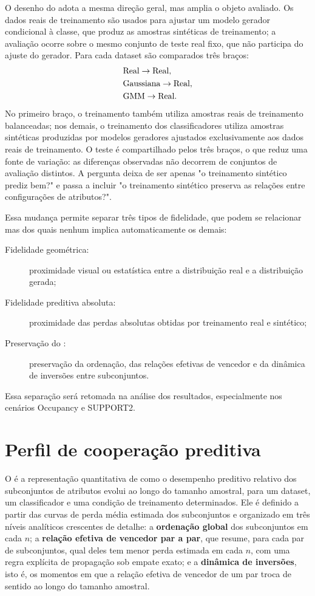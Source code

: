 O desenho do \CoInfoSim{} adota a mesma direção geral, mas amplia o objeto avaliado. Os dados reais de treinamento são usados para ajustar um modelo gerador condicional à classe, que produz as amostras sintéticas de treinamento; a avaliação ocorre sobre o mesmo conjunto de teste real fixo, que não participa do ajuste do gerador. Para cada dataset são comparados três braços:
\begin{align}
  &\text{Real}\rightarrow\text{Real},\label{eq:arm-real}\\
  &\text{Gaussiana}\rightarrow\text{Real},\label{eq:arm-gaussian}\\
  &\text{GMM}\rightarrow\text{Real}.\label{eq:arm-gmm}
\end{align}
No primeiro braço, o treinamento também utiliza amostras reais de treinamento balanceadas; nos demais, o treinamento dos classificadores utiliza amostras sintéticas produzidas por modelos geradores ajustados exclusivamente aos dados reais de treinamento. O teste é compartilhado pelos três braços, o que reduz uma fonte de variação: as diferenças observadas não decorrem de conjuntos de avaliação distintos. A pergunta deixa de ser apenas "o treinamento sintético prediz bem?" e passa a incluir "o treinamento sintético preserva as relações entre configurações de atributos?".

Essa mudança permite separar três tipos de fidelidade, que podem se relacionar mas dos quais nenhum implica automaticamente os demais:

\begin{description}
  \item[Fidelidade geométrica:] proximidade visual ou estatística entre a distribuição real e a distribuição gerada;
  \item[Fidelidade preditiva absoluta:] proximidade das perdas absolutas obtidas por treinamento real e sintético;
  \item[Preservação do \PredictiveCooperationProfile:] preservação da ordenação, das relações efetivas de vencedor e da dinâmica de inversões entre subconjuntos.
\end{description}

Essa separação será retomada na análise dos resultados, especialmente nos cenários Occupancy e SUPPORT2.

\section{Perfil de cooperação preditiva}

O \PredictiveCooperationProfile{} é a representação quantitativa de como o desempenho preditivo relativo dos subconjuntos de atributos evolui ao longo do tamanho amostral, para um dataset, um classificador e uma condição de treinamento determinados. Ele é definido a partir das curvas de perda média estimada dos subconjuntos e organizado em três níveis analíticos crescentes de detalhe: a \textbf{ordenação global} dos subconjuntos em cada $n$; a \textbf{relação efetiva de vencedor par a par}, que resume, para cada par de subconjuntos, qual deles tem menor perda estimada em cada $n$, com uma regra explícita de propagação sob empate exato; e a \textbf{dinâmica de inversões}, isto é, os momentos em que a relação efetiva de vencedor de um par troca de sentido ao longo do tamanho amostral.

